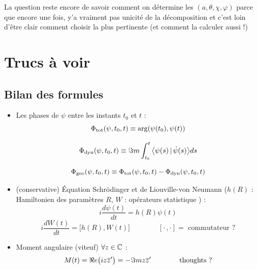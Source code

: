La question reste encore de savoir comment on détermine les $(a,\theta,\chi,\varphi)$ parce que encore une fois, y'a vraiment pas unicité de la décomposition et c'est loin d'être clair comment choisir la plus pertinente (et comment la calculer aussi !)



\section{Trucs à voir}

\subsection{Bilan des formules}

\begin{itemize}
	\item Les phases de $\psi$ entre les instants $t_0$ et $t$ :
	\begin{equation}\label{eq:phase_tot}
		\Phi_{\text{tot}}(\psi, t_0, t) \equiv \arg(\psi(t_0), \psi(t))
	\end{equation}
	
	\begin{equation}\label{eq:phase_dyn}
		\Phi_{\text{dyn}}(\psi,t_0,t) \equiv \Im m \int_{t_0}^t\big\langle \psi(s) \,|\, \dot{\psi}(s) \big\rangle ds
	\end{equation}
	
	\begin{equation}\label{eq:phase_geo}
		\Phi_{\text{geo}}(\psi, t_0, t) \equiv  \Phi_{\text{tot}}(\psi, t_0, t) - \Phi_{\text{dyn}}(\psi,t_0,t)
	\end{equation}
	
	\item (conservative) Équation Schrödinger et de Liouville-von Neumann ($h(R)$ : Hamiltonien des paramètres $R$, $W$ : opérateurs statistique ) \cite[p.6]{bohm_geometric_2003} :
	\begin{equation}\label{eq:schrodinger}
		i\frac{d \psi(t)}{dt} = h(R)\psi(t)
	\end{equation}
	\begin{equation}\label{eq:liouville-neumann}
		i\frac{d W(t)}{dt} = \big[h(R),W(t)\big] \qquad\qquad [\cdot\,,\cdot]=\text{ commutateur ?}
	\end{equation}
	
	\item Moment angulaire (viteuf) $\forall z\in\mathbb{C}$ :
	\begin{equation}\label{eq:mom_angu}
		M(t) = \Re e \big(iz\overline{z}'\big) = -\Im m z\overline{z}'  \qquad\qquad \text{thoughts ?}
	\end{equation}
	
\end{itemize}


